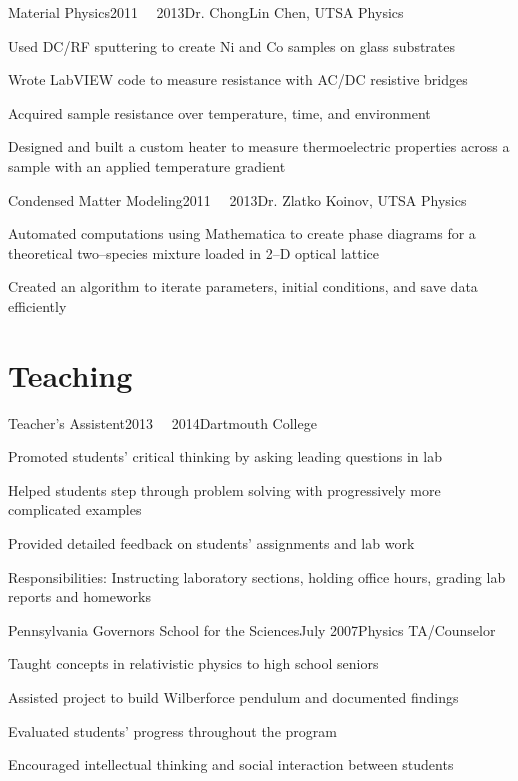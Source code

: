 \documentclass[12pt,a4paper]{resume}
\begin{document}
\begin{work}{Material Physics}{2011  \textemdash \ \ 2013}{Dr. ChongLin Chen, UTSA Physics}
\item{Used DC/RF sputtering to create Ni and Co samples on glass substrates}
\item{Wrote LabVIEW code to measure resistance with AC/DC resistive bridges}
\item{\normalsize Acquired sample resistance over temperature, time, and environment}
\item{Designed and built a custom heater to measure thermoelectric properties across a sample with an applied temperature gradient}
\end{work}

\begin{work}{Condensed Matter Modeling}{2011  \textemdash \ \ 2013}{Dr. Zlatko Koinov, UTSA Physics}
\item{Automated computations using Mathematica to create phase diagrams for a theoretical two–species mixture loaded in 2–D optical lattice}
\item{Created an algorithm to iterate parameters, initial conditions, and save data efficiently}
\end{work}

\section*{Teaching}
\begin{work}{Teacher's Assistent}{2013  \textemdash \ \ 2014}{Dartmouth College}
\item{Promoted students' critical thinking by asking leading questions in lab}
\item{Helped students step through problem solving with progressively more complicated examples}
\item{Provided detailed feedback on students' assignments and lab work}
\item{Responsibilities: Instructing laboratory sections, holding office hours, grading lab reports and homeworks}
\end{work}

\begin{work}{Pennsylvania Governors School for the Sciences}{July 2007}{Physics TA/Counselor}
\item{Taught concepts in relativistic physics to high school seniors}
\item{Assisted project to build Wilberforce pendulum and documented findings}
\item{Evaluated students’ progress throughout the program}
\item{Encouraged intellectual thinking and social interaction between students}
\end{work}
\end{document}
